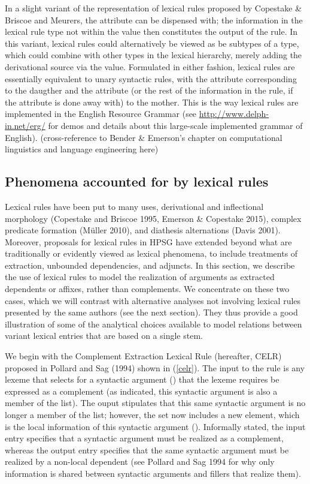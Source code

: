 \documentclass[output=paper]{langsci/langscibook}
\begin{document}
In a slight variant of the representation of lexical rules proposed by Copestake \& Briscoe and Meurers, the  attribute can be dispensed with; the information in the lexical rule type not within the  value then constitutes the output of the rule.
In this variant, lexical rules could alternatively be viewed as be subtypes of a  type, which could combine with other types in the lexical hierarchy, merely adding the derivational source via the  value. 
Formulated in either fashion, lexical rules are essentially equivalent to unary syntactic rules, with the  attribute corresponding to the daugther and the  attribute (or the rest of the information in the rule, if the  attribute is done away with) to the mother. This is the way lexical rules are implemented in the English Resource Grammar (see \url{http://www.delph-in.net/erg/} for demos and details about this large-scale implemented grammar of English). (cross-reference to Bender \& Emerson's chapter on computational linguistics and language engineering here)


	\subsection{Phenomena accounted for by lexical rules}

Lexical rules have been put to many uses, derivational and inflectional morphology (Copestake and Briscoe 1995, Emerson \& Copestake 2015), complex predicate formation (Müller 2010), and diathesis alternations (Davis 2001). Moreover, proposals for lexical rules in HPSG have extended beyond what are traditionally or evidently viewed as lexical phenomena, to include treatments of extraction, unbounded dependencies, and adjuncts. In this section, we describe the use of lexical rules to model the realization of arguments as extracted dependents or affixes, rather than complements. We concentrate on these two cases, which we will contrast with alternative analyses not involving lexical rules presented by the same authors (see the next section). They thus provide a good illustration of some of the analytical choices available to model relations between variant lexical entries that are based on a single stem. 


We begin with the Complement Extraction Lexical Rule (hereafter, CELR) proposed in Pollard and Sag (1994) shown in (\ref{celr}). The input to the rule is any lexeme that selects for a syntactic argument () that the lexeme requires be expressed as a complement (as indicated, this syntactic argument is also a member of the  list). The ouput stipulates that this same syntactic argument is no longer a member of the  list; however, the  set now includes a new element, which is the local information of this syntactic argument (). Informally stated, the input entry specifies that a syntactic argument must be realized as a complement, whereas the output entry specifies that the same syntactic argument must be realized by a non-local dependent (see Pollard and Sag 1994 for why only  information is shared between syntactic arguments and fillers that realize them).
\end{document}

